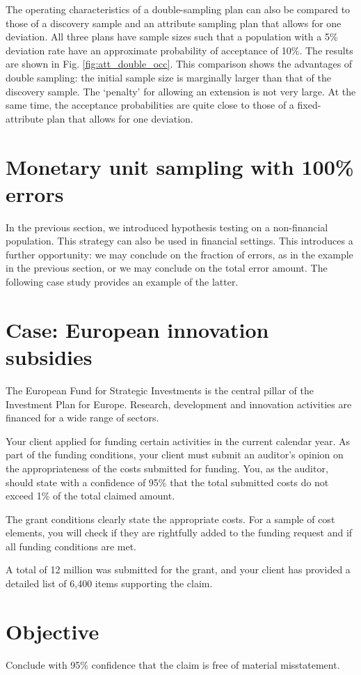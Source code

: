 The operating characteristics of a double-sampling plan can also be compared to those of a discovery sample and an attribute sampling plan that allows for one deviation. All three plans have sample sizes such that a population with a 5\% deviation rate have an approximate probability of acceptance of 10\%. The results are shown in Fig. \ref{fig:att_double_occ}. This comparison shows the advantages of double sampling: the initial sample size is marginally larger than that of the discovery sample. The `penalty' for allowing an extension is not very large. At the same time, the acceptance probabilities are quite close to those of a fixed-attribute plan that allows for one deviation.


\section{Monetary unit sampling with 100\% errors} %
\label{sec:monetary_unit_sampling}

In the previous section, we introduced hypothesis testing on a non-financial population. This strategy can also be used in financial settings. This introduces a further opportunity: we may conclude on the fraction of errors, as in the example in the previous section, or we may conclude on the total error amount. The following case study provides an example of the latter.

\begin{mdframed}[hidealllines=true,backgroundcolor=KPMG_blue!10]
\section*{Case: European innovation subsidies}
The European Fund for Strategic Investments is the central pillar of the Investment Plan for Europe. Research, development and innovation activities are financed for a wide range of sectors. 

Your client applied for funding certain activities in the current calendar year. As part of the funding conditions, your client must submit an auditor's opinion on the appropriateness of the costs submitted for funding. You, as the auditor, should state with a confidence of 95\% that the total submitted costs do not exceed 1\% of the total claimed amount.

The grant conditions clearly state the appropriate costs. For a sample of cost elements, you will check if they are rightfully added to the funding request and if all funding conditions are met.

\bigskip
A total of 12 million was submitted for the grant, and your client has provided a detailed list of 6,400 items supporting the claim.

\section*{Objective}
Conclude with 95\% confidence that the claim is free of material misstatement.

\end{mdframed}

